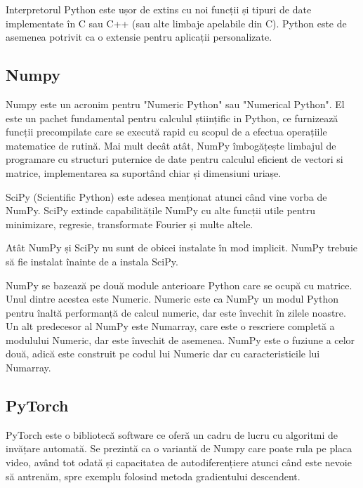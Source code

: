 Interpretorul Python este ușor de extins cu noi funcții și tipuri de date implementate în C sau C++ (sau alte limbaje apelabile din C). Python este de asemenea potrivit ca o extensie pentru aplicații personalizate.
\cite{python_tutorial}

\subsection{Numpy}

Numpy este un acronim pentru "Numeric Python" sau "Numerical Python". El este un pachet fundamental pentru calculul științific in Python, ce furnizează funcții precompilate care se execută rapid cu scopul de a efectua operațiile matematice de rutină.  Mai mult decât atât, NumPy îmbogățește limbajul de programare cu structuri puternice de date pentru calculul eficient de vectori si matrice, implementarea sa suportând chiar și dimensiuni uriașe.

SciPy (Scientific Python) este adesea menționat atunci când vine vorba de NumPy. SciPy extinde capabilitățile NumPy cu alte funcții utile pentru minimizare, regresie, transformate Fourier și multe altele.

Atât NumPy și SciPy nu sunt de obicei instalate în mod implicit. NumPy trebuie să fie instalat înainte de a instala SciPy. 

NumPy se bazează pe două module anterioare Python care se ocupă cu matrice. Unul dintre acestea este Numeric. Numeric este ca NumPy un modul Python pentru înaltă performanță de calcul numeric, dar este învechit în zilele noastre. Un alt predecesor al NumPy este Numarray, care este o rescriere completă a modulului Numeric, dar este învechit de asemenea. NumPy este o fuziune a celor două, adică este construit pe codul lui Numeric dar cu caracteristicile lui Numarray.

\subsection{PyTorch}


PyTorch este o bibliotecă software ce oferă un cadru de lucru cu algoritmi de invățare automată. Se prezintă ca o variantă de Numpy care poate rula pe placa video, având tot odată și capacitatea de autodiferențiere atunci când este nevoie să antrenăm, spre exemplu folosind metoda gradientului descendent.


